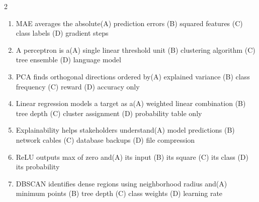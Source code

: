 \documentclass[a4paper]{article}
\begin{document}
\begin{multicols*}{2}
\begin{enumerate}
\item MAE averages the absolute\newline\hspace*{0.6em}(A) prediction errors \quad (B) squared features \newline\hspace*{0.6em}(C) class labels \quad (D) gradient steps
\item A perceptron is a\newline\hspace*{0.6em}(A) single linear threshold unit \quad (B) clustering algorithm \newline\hspace*{0.6em}(C) tree ensemble \quad (D) language model
\item PCA finds orthogonal directions ordered by\newline\hspace*{0.6em}(A) explained variance \quad (B) class frequency \newline\hspace*{0.6em}(C) reward \quad (D) accuracy only
\item Linear regression models a target as a\newline\hspace*{0.6em}(A) weighted linear combination \quad (B) tree depth \newline\hspace*{0.6em}(C) cluster assignment \quad (D) probability table only
\item Explainability helps stakeholders understand\newline\hspace*{0.6em}(A) model predictions \quad (B) network cables \newline\hspace*{0.6em}(C) database backups \quad (D) file compression
\item ReLU outputs max of zero and\newline\hspace*{0.6em}(A) its input \quad (B) its square \newline\hspace*{0.6em}(C) its class \quad (D) its probability
\item DBSCAN identifies dense regions using neighborhood radius and\newline\hspace*{0.6em}(A) minimum points \quad (B) tree depth \newline\hspace*{0.6em}(C) class weights \quad (D) learning rate

\end{enumerate}
\end{multicols*}
\end{document}
